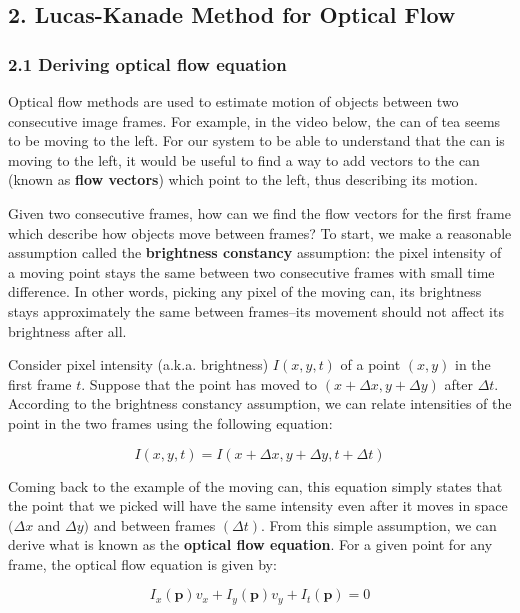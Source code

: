 \documentclass[11pt]{article}
\begin{document}
    \hypertarget{lucas-kanade-method-for-optical-flow}{%
\subsection{2. Lucas-Kanade Method for Optical
Flow}\label{lucas-kanade-method-for-optical-flow}}

\hypertarget{deriving-optical-flow-equation}{%
\subsubsection{2.1 Deriving optical flow
equation}\label{deriving-optical-flow-equation}}

Optical flow methods are used to estimate motion of objects between two
consecutive image frames. For example, in the video below, the can of
tea seems to be moving to the left. For our system to be able to
understand that the can is moving to the left, it would be useful to
find a way to add vectors to the can (known as \textbf{flow vectors})
which point to the left, thus describing its motion.

Given two consecutive frames, how can we find the flow vectors for the
first frame which describe how objects move between frames? To start, we
make a reasonable assumption called the \textbf{brightness constancy}
assumption: the pixel intensity of a moving point stays the same between
two consecutive frames with small time difference. In other words,
picking any pixel of the moving can, its brightness stays approximately
the same between frames--its movement should not affect its brightness
after all.

Consider pixel intensity (a.k.a. brightness) \(I(x, y, t)\) of a point
\((x, y)\) in the first frame \(t\). Suppose that the point has moved to
\((x+\Delta{x}, y+\Delta{y})\) after \(\Delta{t}\). According to the
brightness constancy assumption, we can relate intensities of the point
in the two frames using the following equation:

\[
I(x,y,t)=I(x+\Delta{x},y+\Delta{y},t+\Delta{t})
\]

Coming back to the example of the moving can, this equation simply
states that the point that we picked will have the same intensity even
after it moves in space \((\Delta{x}\) and \(\Delta{y})\) and between
frames \((\Delta{t})\). From this simple assumption, we can derive what
is known as the \textbf{optical flow equation}. For a given point for
any frame, the optical flow equation is given by:

\[
I_x({\mathbf{p}})v_{x} +
I_y({\mathbf{p}})v_{y} +
I_t({\mathbf{p}})
= 0
\]
\end{document}
